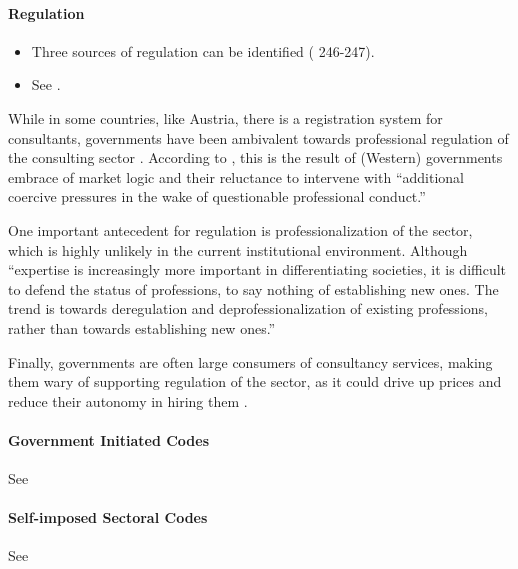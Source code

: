 \documentclass[12pt]{article}
\providecommand{\tightlist}{%
  \setlength{\itemsep}{0pt}\setlength{\parskip}{0pt}}
\begin{document}
\hypertarget{regulation}{%
\paragraph{Regulation}\label{regulation}}

\begin{itemize}
\tightlist
\item
  Three sources of regulation can be identified (\citet{clark1993}
  246-247).
\item
  See \citet[813-817]{muzio2011}.
\end{itemize}

While in some countries, like Austria, there is a registration system
for consultants, governments have been ambivalent towards professional
regulation of the consulting sector \citep[ 814]{muzio2011}. According
to \citet{leicht2006}, this is the result of (Western) governments
embrace of market logic and their reluctance to intervene with
``additional coercive pressures in the wake of questionable professional
conduct.''

One important antecedent for regulation is professionalization of the
sector, which is highly unlikely in the current institutional
environment. Although ``expertise is increasingly more important in
differentiating societies, it is difficult to defend the status of
professions, to say nothing of establishing new ones. The trend is
towards deregulation and deprofessionalization of existing professions,
rather than towards establishing new ones.'' \citep[ 90]{kieser2006}

Finally, governments are often large consumers of consultancy services,
making them wary of supporting regulation of the sector, as it could
drive up prices and reduce their autonomy in hiring them \citep[
815]{muzio2011}.

\hypertarget{government-initiated-codes}{%
\paragraph{Government Initiated
Codes}\label{government-initiated-codes}}

See \citet[3-4]{sturdy2021}

\hypertarget{self-imposed-sectoral-codes}{%
\paragraph{Self-imposed Sectoral
Codes}\label{self-imposed-sectoral-codes}}

See \citet[4]{sturdy2021}
\end{document}
